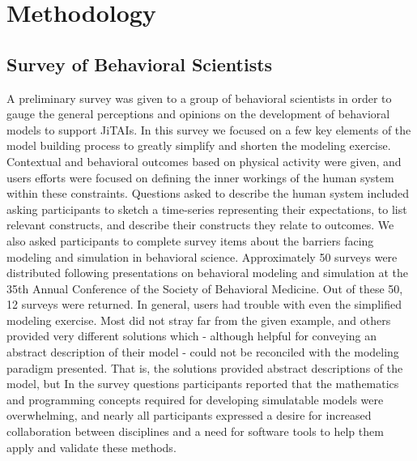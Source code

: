 \documentclass{sigchi}
\begin{document}

\section{Methodology}
\subsection{Survey of Behavioral Scientists}
A preliminary survey was given to a group of behavioral scientists in order to gauge the general perceptions and opinions on the development of behavioral models to support JiTAIs.
In this survey we focused on a few key elements of the model building process to greatly simplify and shorten the modeling exercise.
Contextual and behavioral outcomes based on physical activity were given, and users efforts were focused on defining the inner workings of the human system within these constraints.
Questions asked to describe the human system included asking participants to sketch a time-series representing their expectations, to list relevant constructs, and describe their constructs they relate to outcomes.
We also asked participants to complete survey items about the barriers facing modeling and simulation in behavioral science.
Approximately 50 surveys were distributed following presentations on behavioral modeling and simulation at the 35th Annual Conference of the Society of Behavioral Medicine. 
Out of these 50, 12 surveys were returned.
In general, users had trouble with even the simplified modeling exercise.
Most did not stray far from the given example, and others provided very different solutions which - although helpful for conveying an abstract description of their model - could not be reconciled with the modeling paradigm presented.
That is, the solutions provided abstract descriptions of the model, but 
In the survey questions participants reported that the mathematics and programming concepts required for developing simulatable models were overwhelming, and nearly all participants expressed a desire for increased collaboration between disciplines and a need for software tools to help them apply and validate these methods.
\end{document}
